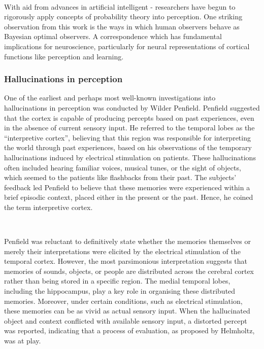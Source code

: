 \documentclass{article}
\begin{document}
\

With aid from advances in artificial intelligent - researchers have begun to rigorously apply concepts of probability theory into perception. \citep{knill2004bayesian} One striking observation from this work is the ways in which human observers behave as Bayesian optimal observers. A correspondence which has fundamental implications for neuroscience, particularly for neural representations of cortical functions like perception and learning. \citep{trommershauser2003statisticalb, trommershauser2003statisticala}

\subsubsection{Hallucinations in perception}

One of the earliest and perhaps most well-known investigations into hallucinations in perception was conducted by Wilder Penfield. \citep{penfield1961activation} Penfield suggested that the cortex is capable of producing percepts based on past experiences, even in the absence of current sensory input. He referred to the temporal lobes as the ``interpretive cortex'', believing that this region was responsible for interpreting the world through past experiences, based on his observations of the temporary hallucinations induced by electrical stimulation on patients. These hallucinations often included hearing familiar voices, musical tunes, or the sight of objects, which seemed to the patients like flashbacks from their past. The subjects' feedback led Penfield to believe that these memories were experienced within a brief episodic context, placed either in the present or the past. Hence, he coined the term interpretive cortex. \citep{knill2004bayesian}

\

Penfield was reluctant to definitively state whether the memories themselves or merely their interpretations were elicited by the electrical stimulation of the temporal cortex. However, the most parsimonious interpretation suggests that memories of sounds, objects, or people are distributed across the cerebral cortex rather than being stored in a specific region. The medial temporal lobes, including the hippocampus, play a key role in organising these distributed memories. \citep{aggelopoulos2015perceptual} Moreover, under certain conditions, such as electrical stimulation, these memories can be as vivid as actual sensory input. When the hallucinated object and context conflicted with available sensory input, a distorted percept was reported, indicating that a process of evaluation, as proposed by Helmholtz, was at play.
\end{document}
